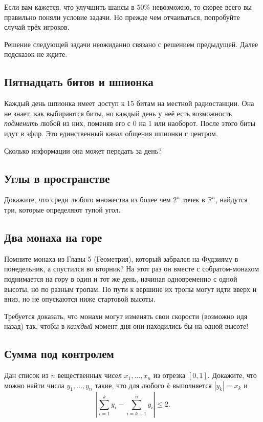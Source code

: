 Если вам кажется, что улучшить шансы в $50\%$ невозможно, то скорее всего вы правильно поняли условие задачи.
Но прежде чем отчаиваться, попробуйте случай трёх игроков.

\medskip 

Решение следующей задачи неожиданно связано с решением предыдущей.
Далее подсказок не ждите.

\subsection*{Пятнадцать битов и шпионка}

Каждый день шпионка имеет доступ к 15 битам на местной радиостанции.
Она не знает, как выбираются биты, но каждый день у неё есть возможность \emph{подменить} любой из них, поменяв его с 0 на 1 или наоборот.
После этого биты идут в эфир. 
Это единственный канал общения шпионки с центром.

Сколько информации она может передать за день?

\subsection*{Углы в пространстве}

Докажите, что среди любого множества из более чем $2^n$ точек в $\mathbb{R}^n$, найдутся три, которые определяют тупой угол.

\subsection*{Два монаха на горе}

Помните монаха из Главы 5 (Геометрия), который забрался на Фудзияму в понедельник, а спустился во вторник?
На этот раз он вместе с собратом-монахом поднимается на гору в один и тот же день, начиная одновременно с одной высоты, но по разным тропам.
По пути к вершине их тропы могут идти вверх и вниз, но не опускаются ниже стартовой высоты.

Требуется доказать, что монахи могут изменять свои скорости (возможно идя назад) так, чтобы в \emph{каждый} момент дня они находились бы на одной высоте!

\subsection*{Сумма под контролем}

Дан список из $n$ вещественных чисел $x_1,\dots,x_n$ из отрезка $[0,1]$.
Докажите, что можно найти числа $y_1,\dots,y_n$ такие, что для любого $k$ выполняется $|y_k|=x_k$ и
\[\left|\sum_{i=1}^ky_i-\sum_{i=k+1}^ny_i\right|\le 2.\]

